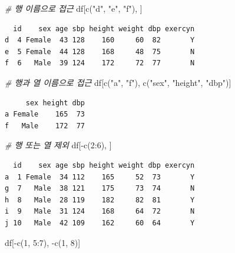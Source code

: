 \documentclass[
  11pt,
]{krantz}
\newenvironment{Shaded}{\begin{snugshade}}{\end{snugshade}}
\newcommand{\CommentTok}[1]{\textcolor[rgb]{0.37,0.37,0.37}{\textit{#1}}}
\newcommand{\DecValTok}[1]{\textcolor[rgb]{0.06,0.06,0.06}{#1}}
\newcommand{\FunctionTok}[1]{\textcolor[rgb]{0,0,0}{#1}}
\newcommand{\NormalTok}[1]{#1}
\newcommand{\SpecialCharTok}[1]{\textcolor[rgb]{0,0,0}{#1}}
\newcommand{\StringTok}[1]{\textcolor[rgb]{0.5,0.5,0.5}{#1}}
\begin{document}
\begin{Shaded}
\begin{Highlighting}[]
\CommentTok{\# 행 이름으로 접근}
\NormalTok{df[}\FunctionTok{c}\NormalTok{(}\StringTok{"d"}\NormalTok{, }\StringTok{"e"}\NormalTok{, }\StringTok{"f"}\NormalTok{), ]}
\end{Highlighting}
\end{Shaded}

\begin{verbatim}
  id    sex age sbp height weight dbp exercyn
d  4 Female  43 128    160     60  82       Y
e  5 Female  44 128    168     48  75       N
f  6   Male  39 124    172     72  77       N
\end{verbatim}

\begin{Shaded}
\begin{Highlighting}[]
\CommentTok{\# 행과 열 이름으로 접근}
\NormalTok{df[}\FunctionTok{c}\NormalTok{(}\StringTok{"a"}\NormalTok{, }\StringTok{"f"}\NormalTok{), }\FunctionTok{c}\NormalTok{(}\StringTok{"sex"}\NormalTok{, }\StringTok{"height"}\NormalTok{, }\StringTok{"dbp"}\NormalTok{)]}
\end{Highlighting}
\end{Shaded}

\begin{verbatim}
     sex height dbp
a Female    165  73
f   Male    172  77
\end{verbatim}

\begin{Shaded}
\begin{Highlighting}[]
\CommentTok{\# 행 또는 열 제외}
\NormalTok{df[}\SpecialCharTok{{-}}\FunctionTok{c}\NormalTok{(}\DecValTok{2}\SpecialCharTok{:}\DecValTok{6}\NormalTok{), ]}
\end{Highlighting}
\end{Shaded}

\begin{verbatim}
  id    sex age sbp height weight dbp exercyn
a  1 Female  34 112    165     52  73       Y
g  7   Male  38 121    175     73  74       N
h  8   Male  28 119    182     82  81       Y
i  9   Male  31 124    168     64  72       N
j 10   Male  42 109    162     60  64       Y
\end{verbatim}

\begin{Shaded}
\begin{Highlighting}[]
\NormalTok{df[}\SpecialCharTok{{-}}\FunctionTok{c}\NormalTok{(}\DecValTok{1}\NormalTok{, }\DecValTok{5}\SpecialCharTok{:}\DecValTok{7}\NormalTok{), }\SpecialCharTok{{-}}\FunctionTok{c}\NormalTok{(}\DecValTok{1}\NormalTok{, }\DecValTok{8}\NormalTok{)]}
\end{Highlighting}
\end{Shaded}
\end{document}
